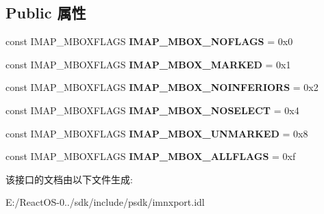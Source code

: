 \subsection*{Public 属性}
\begin{DoxyCompactItemize}
\item 
\mbox{\label{interface_i_i_m_a_p_callback_a8e5facffb393fd7091c8566747708f29}} 
const I\+M\+A\+P\+\_\+\+M\+B\+O\+X\+F\+L\+A\+GS {\bfseries I\+M\+A\+P\+\_\+\+M\+B\+O\+X\+\_\+\+N\+O\+F\+L\+A\+GS} = 0x0
\item 
\mbox{\label{interface_i_i_m_a_p_callback_af7121f673ff52906481b36551961a626}} 
const I\+M\+A\+P\+\_\+\+M\+B\+O\+X\+F\+L\+A\+GS {\bfseries I\+M\+A\+P\+\_\+\+M\+B\+O\+X\+\_\+\+M\+A\+R\+K\+ED} = 0x1
\item 
\mbox{\label{interface_i_i_m_a_p_callback_a789108cfabc20f205ad356ae1dec8a3f}} 
const I\+M\+A\+P\+\_\+\+M\+B\+O\+X\+F\+L\+A\+GS {\bfseries I\+M\+A\+P\+\_\+\+M\+B\+O\+X\+\_\+\+N\+O\+I\+N\+F\+E\+R\+I\+O\+RS} = 0x2
\item 
\mbox{\label{interface_i_i_m_a_p_callback_aaae17e3d1ded1f2d57e8d95461ee89c0}} 
const I\+M\+A\+P\+\_\+\+M\+B\+O\+X\+F\+L\+A\+GS {\bfseries I\+M\+A\+P\+\_\+\+M\+B\+O\+X\+\_\+\+N\+O\+S\+E\+L\+E\+CT} = 0x4
\item 
\mbox{\label{interface_i_i_m_a_p_callback_a57b06bfda04c48c3e9e23791394632fc}} 
const I\+M\+A\+P\+\_\+\+M\+B\+O\+X\+F\+L\+A\+GS {\bfseries I\+M\+A\+P\+\_\+\+M\+B\+O\+X\+\_\+\+U\+N\+M\+A\+R\+K\+ED} = 0x8
\item 
\mbox{\label{interface_i_i_m_a_p_callback_a2b1e89e00b4d55a54932e37adeb92af7}} 
const I\+M\+A\+P\+\_\+\+M\+B\+O\+X\+F\+L\+A\+GS {\bfseries I\+M\+A\+P\+\_\+\+M\+B\+O\+X\+\_\+\+A\+L\+L\+F\+L\+A\+GS} = 0xf
\end{DoxyCompactItemize}


该接口的文档由以下文件生成\+:\begin{DoxyCompactItemize}
\item 
E\+:/\+React\+O\+S-\/0../sdk/include/psdk/imnxport.\+idl\end{DoxyCompactItemize}
